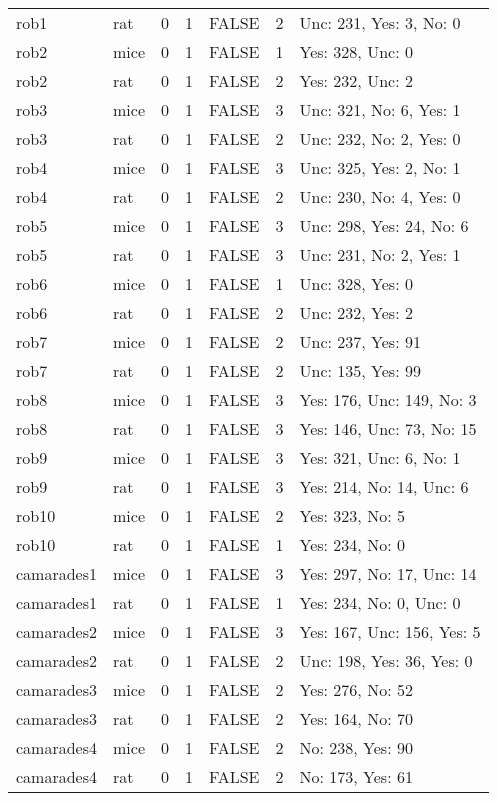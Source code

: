 \documentclass[
]{article}
\begin{document}
\begin{longtable}[]{@{}llrrlrl@{}}
rob1 & rat & 0 & 1 & FALSE & 2 & Unc: 231, Yes: 3, No: 0 \\
rob2 & mice & 0 & 1 & FALSE & 1 & Yes: 328, Unc: 0 \\
rob2 & rat & 0 & 1 & FALSE & 2 & Yes: 232, Unc: 2 \\
rob3 & mice & 0 & 1 & FALSE & 3 & Unc: 321, No: 6, Yes: 1 \\
rob3 & rat & 0 & 1 & FALSE & 2 & Unc: 232, No: 2, Yes: 0 \\
rob4 & mice & 0 & 1 & FALSE & 3 & Unc: 325, Yes: 2, No: 1 \\
rob4 & rat & 0 & 1 & FALSE & 2 & Unc: 230, No: 4, Yes: 0 \\
rob5 & mice & 0 & 1 & FALSE & 3 & Unc: 298, Yes: 24, No: 6 \\
rob5 & rat & 0 & 1 & FALSE & 3 & Unc: 231, No: 2, Yes: 1 \\
rob6 & mice & 0 & 1 & FALSE & 1 & Unc: 328, Yes: 0 \\
rob6 & rat & 0 & 1 & FALSE & 2 & Unc: 232, Yes: 2 \\
rob7 & mice & 0 & 1 & FALSE & 2 & Unc: 237, Yes: 91 \\
rob7 & rat & 0 & 1 & FALSE & 2 & Unc: 135, Yes: 99 \\
rob8 & mice & 0 & 1 & FALSE & 3 & Yes: 176, Unc: 149, No: 3 \\
rob8 & rat & 0 & 1 & FALSE & 3 & Yes: 146, Unc: 73, No: 15 \\
rob9 & mice & 0 & 1 & FALSE & 3 & Yes: 321, Unc: 6, No: 1 \\
rob9 & rat & 0 & 1 & FALSE & 3 & Yes: 214, No: 14, Unc: 6 \\
rob10 & mice & 0 & 1 & FALSE & 2 & Yes: 323, No: 5 \\
rob10 & rat & 0 & 1 & FALSE & 1 & Yes: 234, No: 0 \\
camarades1 & mice & 0 & 1 & FALSE & 3 & Yes: 297, No: 17, Unc: 14 \\
camarades1 & rat & 0 & 1 & FALSE & 1 & Yes: 234, No: 0, Unc: 0 \\
camarades2 & mice & 0 & 1 & FALSE & 3 & Yes: 167, Unc: 156, Yes: 5 \\
camarades2 & rat & 0 & 1 & FALSE & 2 & Unc: 198, Yes: 36, Yes: 0 \\
camarades3 & mice & 0 & 1 & FALSE & 2 & Yes: 276, No: 52 \\
camarades3 & rat & 0 & 1 & FALSE & 2 & Yes: 164, No: 70 \\
camarades4 & mice & 0 & 1 & FALSE & 2 & No: 238, Yes: 90 \\
camarades4 & rat & 0 & 1 & FALSE & 2 & No: 173, Yes: 61 \\

\end{longtable}
\end{document}
